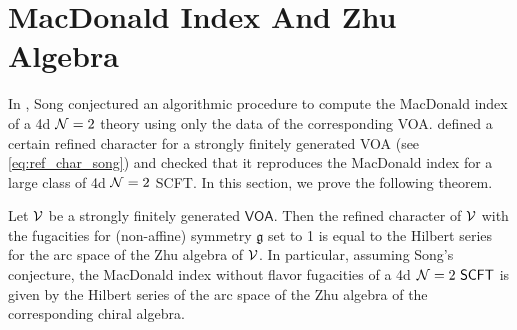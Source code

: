 \documentclass[a4paper,10pt]{article}
\newcommand{\C}{\mathds{C}}
\newcommand{\mr}[1]{\mathsf{#1}}
\newcommand{\tsf}[1]{\textsf{#1}}
\newcommand{\mf}[1]{\mathfrak{#1}}
\def\CN {{\cal N}}
\def\CV {{\cal V}}
\begin{document}
\section{MacDonald Index And Zhu Algebra}\label{sec:Mac_Hil_ser_arc}
In \cite{Song:2016yfd}, Song conjectured an algorithmic procedure to compute the MacDonald index of a 4d $\CN=2$ theory using only the data of the corresponding \tsf{VOA}. \cite{Song:2016yfd} defined a certain refined character for a strongly finitely generated \tsf{VOA} (see \eqref{eq:ref_char_song}) and checked that it reproduces the MacDonald index for a large class of 4d $\CN=2$ \tsf{SCFT}.   In this section, we prove the following theorem.
\begin{thm}\label{thm:Hil_ser_mac}
Let $\CV$ be a strongly finitely generated $\mr{VOA}$. Then the refined character of $\CV$ with the fugacities for (non-affine) symmetry $\mf{g}$ set to 1 is equal to the Hilbert series for the arc space of the Zhu algebra of $\CV$. In particular, assuming Song's conjecture, 
the MacDonald index without flavor fugacities of a 4d $\CN=2~\mr{SCFT}$ is given by the Hilbert series of the arc space of the Zhu algebra of the corresponding chiral algebra.     
\end{thm}
\end{document}
